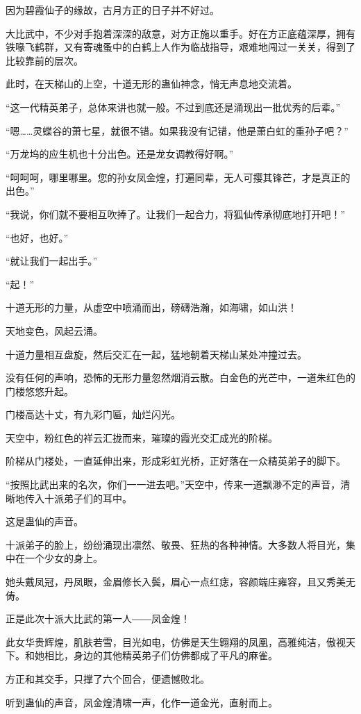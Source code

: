 \begin{this_body}
因为碧霞仙子的缘故，古月方正的日子并不好过。

大比武中，不少对手抱着深深的敌意，对方正施以重手。好在方正底蕴深厚，拥有铁喙飞鹤群，又有寄魂蚤中的白鹤上人作为临战指导，艰难地闯过一关关，得到了比较靠前的层次。

此时，在天梯山的上空，十道无形的蛊仙神念，悄无声息地交流着。

“这一代精英弟子，总体来讲也就一般。不过到底还是涌现出一批优秀的后辈。”

“嗯……灵蝶谷的萧七星，就很不错。如果我没有记错，他是萧白虹的重孙子吧？”

“万龙坞的应生机也十分出色。还是龙女调教得好啊。”

“呵呵呵，哪里哪里。您的孙女凤金煌，打遍同辈，无人可撄其锋芒，才是真正的出色。”

“我说，你们就不要相互吹捧了。让我们一起合力，将狐仙传承彻底地打开吧！”

“也好，也好。”

“就让我们一起出手。”

“起！”

十道无形的力量，从虚空中喷涌而出，磅礴浩瀚，如海啸，如山洪！

天地变色，风起云涌。

十道力量相互盘旋，然后交汇在一起，猛地朝着天梯山某处冲撞过去。

没有任何的声响，恐怖的无形力量忽然烟消云散。白金色的光芒中，一道朱红色的门楼悠悠升起。

门楼高达十丈，有九彩门匾，灿烂闪光。

天空中，粉红色的祥云汇拢而来，璀璨的霞光交汇成光的阶梯。

阶梯从门楼处，一直延伸出来，形成彩虹光桥，正好落在一众精英弟子的脚下。

“按照比武出来的名次，你们一一进去吧。”天空中，传来一道飘渺不定的声音，清晰地传入十派弟子们的耳中。

这是蛊仙的声音。

十派弟子的脸上，纷纷涌现出凛然、敬畏、狂热的各种神情。大多数人将目光，集中在一个少女的身上。

她头戴凤冠，丹凤眼，金眉修长入鬓，眉心一点红痣，容颜端庄雍容，且又秀美无俦。

正是此次十派大比武的第一人――凤金煌！

此女华贵辉煌，肌肤若雪，目光如电，仿佛是天生翱翔的凤凰，高雅纯洁，傲视天下。和她相比，身边的其他精英弟子们仿佛都成了平凡的麻雀。

方正和其交手，只撑了六个回合，便遗憾败北。

听到蛊仙的声音，凤金煌清啸一声，化作一道金光，直射而上。


\end{this_body}
